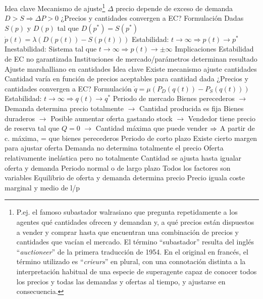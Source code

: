 \documentclass{nuevotema}
\begin{document}
\begin{esquemal}
			\3 Idea clave
				\4 Mecanismo de ajuste\footnote{P.ej. el famoso subastador walrasiano que pregunta repetidamente a los agentes qué cantidades ofrecen y demandan y, a qué precios están dispuestos a vender y comprar hasta que encuentran una combinación de precios y cantidades que vacían el mercado. El término ``subastador'' resulta del inglés ``\textit{auctioneer}'' de la primera traducción de 1954. En el original en francés, el término utilizado es ``\textit{crieurs}'' en plural, con una connotación distinta a la interpretación habitual de una especie de superagente capaz de conocer todos los precios y todas las demandas y ofertas al tiempo, y ajustarse en consecuencia.}
				\4[] $\varDelta$ precio depende de exceso de demanda
				\4[] $D > S \Rightarrow \varDelta P > 0 $
				\4[] ¿Precios y cantidades convergen a EC?
			\3 Formulación
				\4 Dadas $S(p)$ y $D(p)$ tal que $D(p^*) = S(p^*)$
				\4 $\dot{p}(t) = \lambda \left( D \left(p (t) \right) - S \left( p(t) \right) \right)$
				\4 Estabilidad:
				\4[] $t \to \infty \Rightarrow p(t) \to p^*$
				\4[] 
				\4 Inestabilidad:
				\4[] Sistema tal que $t \to \infty \Rightarrow p(t) \to \pm \infty$
				\4[] 
			\3 Implicaciones
				\4 Estabilidad de EC no garantizada
				\4 Instituciones de mercado/parámetros determinan resultado
		\2 Ajuste marshalliano en cantidades
			\3 Idea clave
				\4 Existe mecanismo ajuste cantidades
				\4[$\to$] Cantidad varía en función de precios aceptables para cantidad dada
				\4[] ¿Precios y cantidades convergen a EC?
			\3 Formulación
				\4 $\dot{q} = \mu \left( P_D \left( q (t) \right) - P_S \left( q(t) \right) \right)$
				\4 Estabilidad:
				\4[] $t \to \infty \Rightarrow q(t) \to q^*$
				\4[] 
				\4 Periodo de mercado
				\4[] Bienes perecederos
				\4[] $\to$ Demanda determina precio totalmente
				\4[] $\to$ Cantidad producida es fija
				\4[] Bienes duraderos
				\4[] $\to$ Posible aumentar oferta gastando stock
				\4[] $\to$ Vendedor tiene precio de reserva tal que $Q=0$
				\4[] $\to$ Cantidad máxima que puede vender
				\4[] $\Rightarrow$ A partir de c. máxima, = que bienes perecederos
				\4 Periodo de corto plazo
				\4[] Existe cierto margen para ajustar oferta
				\4[] Demanda no determina totalmente el precio
				\4[] Oferta relativamente inelástica pero no totalmente
				\4[] Cantidad se ajusta hasta igualar oferta y demanda
				\4 Periodo normal o de largo plazo
				\4[] Todos los factores son variables
				\4[] Equilibrio de oferta y demanda determina precio
				\4[] Precio iguala coste marginal y medio de l/p

\end{esquemal}
\end{document}
